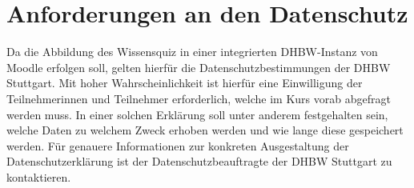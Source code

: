 \section{Anforderungen an den Datenschutz}
Da die Abbildung des Wissensquiz in einer integrierten DHBW-Instanz von Moodle erfolgen soll, gelten hierfür die Datenschutzbestimmungen der DHBW Stuttgart.
Mit hoher Wahrscheinlichkeit ist hierfür eine Einwilligung der Teilnehmerinnen und Teilnehmer erforderlich, welche im Kurs vorab abgefragt werden muss.
In einer solchen Erklärung soll unter anderem festgehalten sein, welche Daten zu welchem Zweck erhoben werden und wie lange diese gespeichert werden.
Für genauere Informationen zur konkreten Ausgestaltung der Datenschutzerklärung ist der Datenschutzbeauftragte der DHBW Stuttgart zu kontaktieren.

